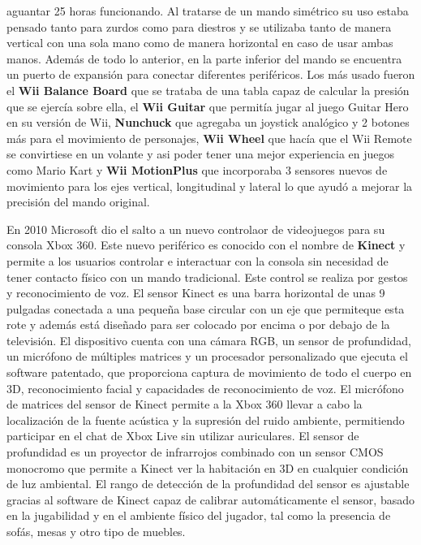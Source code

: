 aguantar 25 horas funcionando. Al tratarse de un mando sim\'etrico su uso estaba pensado tanto para zurdos como para diestros y se utilizaba tanto de manera vertical con una sola mano como de manera horizontal en caso de usar ambas manos. Adem\'as de todo lo anterior, en la parte inferior del mando se encuentra un puerto de expansi\'on para conectar diferentes perif\'ericos. Los m\'as usado fueron el \textbf{Wii Balance Board} que se trataba de una tabla capaz de calcular la presi\'on que se ejerc\'ia sobre ella, el \textbf{Wii Guitar} que permit\'ia jugar al juego Guitar Hero en su versi\'on de Wii, \textbf{Nunchuck} que agregaba un joystick anal\'ogico y 2 botones m\'as para el movimiento de personajes, \textbf{Wii Wheel} que hac\'ia que el Wii Remote se convirtiese en un volante y asi poder tener una mejor experiencia en juegos como Mario Kart y \textbf{Wii MotionPlus} que incorporaba 3 sensores nuevos de movimiento para los ejes vertical, longitudinal y lateral lo que ayud\'o a mejorar la precisi\'on del mando original.\par

En 2010 Microsoft dio el salto a un nuevo controlaor de videojuegos para su consola Xbox 360. Este nuevo perif\'erico es conocido con el nombre de \textbf{Kinect} y permite a los usuarios controlar e interactuar con la consola sin necesidad de tener contacto f\'isico con un mando tradicional. Este control se realiza por gestos y reconocimiento de voz. El sensor Kinect es una barra horizontal de unas 9 pulgadas conectada a una peque\~na base circular con un eje que permiteque esta rote y adem\'as est\'a dise\~nado para ser colocado por encima o por debajo de la televisi\'on. El dispositivo cuenta con una c\'amara RGB, un sensor de profundidad, un micr\'ofono de m\'ultiples matrices y un procesador personalizado que ejecuta el software patentado, que proporciona captura de movimiento de todo el cuerpo en 3D, reconocimiento facial y capacidades de reconocimiento de voz. El micr\'ofono de matrices del sensor de Kinect permite a la Xbox 360 llevar a cabo la localizaci\'on de la fuente ac\'ustica y la supresi\'on del ruido ambiente, permitiendo participar en el chat de Xbox Live sin utilizar auriculares. El sensor de profundidad es un proyector de infrarrojos combinado con un sensor CMOS monocromo que permite a Kinect ver la habitaci\'on en 3D en cualquier condici\'on de luz ambiental. El rango de detecci\'on de la profundidad del sensor es ajustable gracias al software de Kinect capaz de calibrar autom\'aticamente el sensor, basado en la jugabilidad y en el ambiente f\'isico del jugador, tal como la presencia de sof\'as, mesas y otro tipo de muebles.

